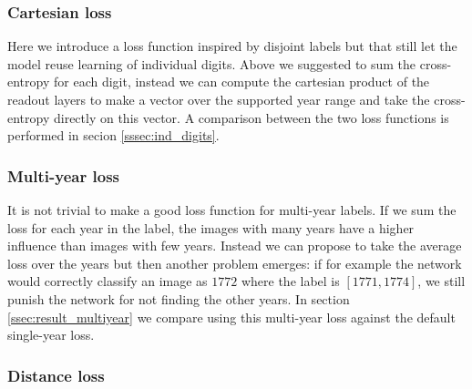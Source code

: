 

\subsubsection{Cartesian loss} \label{sssec:cartesian}

%

Here we introduce a loss function inspired by disjoint labels but that still let the model reuse learning of individual digits. Above we suggested to sum the cross-entropy for each digit, instead we can compute the cartesian product of the readout layers to make a vector over the supported year range and take the cross-entropy directly on this vector. A comparison between the two loss functions is performed in secion \ref{sssec:ind_digits}.


\subsubsection{Multi-year loss}

It is not trivial to make a good loss function for multi-year labels. If we sum the loss for each year in the label, the images with many years have a higher influence than images with few years. Instead we can propose to take the average loss over the years but then another problem emerges: if for example the network would correctly classify an image as $1772$ where the label is $[1771, 1774]$, we still punish the network for not finding the other years.
In section \ref{ssec:result_multiyear} we compare using this multi-year loss against the default single-year loss.

\subsubsection{Distance loss}


